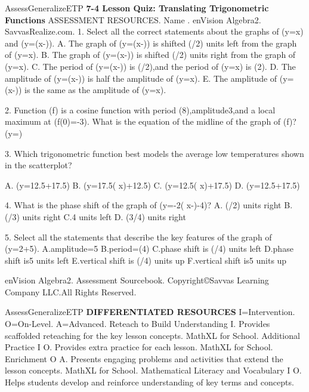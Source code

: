 \documentclass{article}
\newenvironment{te-addendum}[2]{}{}     %
\newcommand{\answer}[1]{}               %
\newcommand{\placeholder}[2]{}          %
\begin{document}
\begin{te-addendum}{Assess}{GeneralizeETP}
\textbf{7-4 Lesson Quiz: Translating Trigonometric Functions}
ASSESSMENT RESOURCES. Name \underline{\hspace{2cm}}. enVision Algebra2. SavvasRealize.com.
1. Select all the correct statements about the graphs of (y=\sin x) and (y=\sin(x-\frac{})).
A. The graph of (y=\sin(x-\frac{})) is shifted (\pi/2) units left from the graph of (y=\sin x).
B. The graph of (y=\sin(x-\frac{})) is shifted (\pi/2) units right from the graph of (y=\sin x).
C. The period of (y=\sin(x-\frac{})) is (\pi/2),and the period of (y=\sin x) is (2\pi).
D. The amplitude of (y=\sin(x-\frac{})) is half the amplitude of (y=\sin x).
E. The amplitude of (y=\sin(x-\frac{})) is the same as the amplitude of (y=\sin x).
\answer{1.B,E}
2. Function (f) is a cosine function with period (8\pi),amplitude3,and a local maximum at (f(0)=-3). What is the equation of the midline of the graph of (f)?
(y=\underline{\hspace{1cm}})
\answer{2.(y=-6)}
3. Which trigonometric function best models the average low temperatures shown in the scatterplot?
\placeholder{graph}{Average Low Temperature(°F),black scatterplot,arrowed x,y axes;horizontal Months; x labels0,4,8,12,16,20,24,grid2; y labels0,10,20,30,grid5,window0..24,0..35. Points integer0..24 follow12.5sin[pi(x-4)/6]+17.5 approximately:6.7,5,6.7,11.3,17.5,23.8,28.3,30,28.3,23.8,17.5,11.3,6.7 then repeat;maxmonths7,19,min1,13.}
A. (y=12.5\sin[\frac\pi6(x+4)]+17.5)
B. (y=17.5\sin(\frac{} x)+12.5)
C. (y=12.5\sin(\frac{} x)+17.5)
D. (y=12.5\sin[\frac\pi6(x-4)]+17.5)
\answer{3.D}
4. What is the phase shift of the graph of (y=-2\sin( x-\frac{})-4)?
A. (\pi/2) units right
B. (\pi/3) units right
C.4 units left
D. (3\pi/4) units right
\answer{4.B}
5. Select all the statements that describe the key features of the graph of (y=2+5).
A.amplitude=5
B.period=(4\pi)
C.phase shift is (\pi/4) units left
D.phase shift is5 units left
E.vertical shift is (\pi/4) units up
F.vertical shift is5 units up
\answer{5.B,C,F}
enVision Algebra2. Assessment Sourcebook. Copyright©Savvas Learning Company LLC.All Rights Reserved.
\end{te-addendum}
\begin{te-addendum}{Assess}{GeneralizeETP}
\textbf{DIFFERENTIATED RESOURCES}
I=Intervention. O=On-Level. A=Advanced.
Reteach to Build Understanding I. Provides scaffolded reteaching for the key lesson concepts. MathXL for School.
Additional Practice I O. Provides extra practice for each lesson. MathXL for School.
Enrichment O A. Presents engaging problems and activities that extend the lesson concepts. MathXL for School.
Mathematical Literacy and Vocabulary I O. Helps students develop and reinforce understanding of key terms and concepts.
\end{te-addendum}
\end{document}

